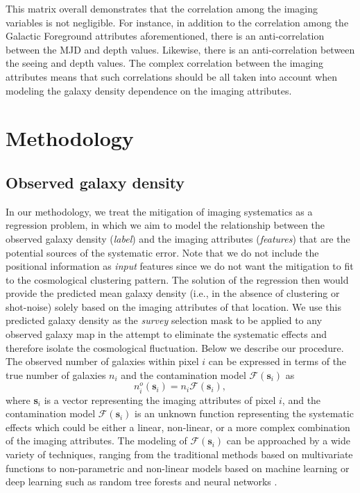 \documentclass[fleqn, usenatbib]{mnras}
\begin{document}
This matrix overall demonstrates that the correlation among the imaging variables is not negligible. For instance, in addition to the correlation among the Galactic Foreground attributes aforementioned, there is an anti-correlation between the MJD and depth values. Likewise, there is an anti-correlation between the seeing and depth values. The complex correlation between the imaging attributes means that such correlations should be all taken into account when modeling the galaxy density dependence on the imaging attributes.

\section{Methodology}\label{sec:method}

\subsection{Observed galaxy density}
In our methodology, we treat the mitigation of imaging systematics as a regression problem, in which we aim to model the relationship between the observed galaxy density (\textit{label}) and the imaging attributes (\textit{features}) that are the potential sources of the systematic error. Note that we do not include the positional information as \textit{input} features since we do not want the mitigation to fit to the cosmological clustering pattern. The solution of the regression then would provide the predicted mean galaxy density (i.e., in the absence of clustering or shot-noise) solely based on the imaging attributes of that location. We use this predicted galaxy density as the \textit{survey} selection mask to be applied to any observed galaxy map in the attempt to eliminate the systematic effects and therefore isolate the cosmological fluctuation. Below we describe our procedure.\\


The observed number of galaxies within pixel $i$ can be expressed in terms of the true number of galaxies $n_{i}$ and the contamination model $\mathcal{F}(\textbf{s}_{i})$ as 
\begin{equation}\label{eq:ngal_fs}
    n_{i}^{o}(\textbf{s}_{i}) = n_{i} \mathcal{F}(\textbf{s}_{i}), 
\end{equation}
where \textbf{s}$_{i}$ is a vector representing the imaging attributes of pixel $i$, and the contamination model $\mathcal{F}(\textbf{s}_i)$ is an unknown function representing the systematic effects which could be either a linear, non-linear, or a more complex combination of the imaging attributes. The modeling of $\mathcal{F}(\textbf{s}_{i})$ can be approached by a wide variety of techniques, ranging from the traditional methods based on multivariate functions to non-parametric and non-linear models based on machine learning or deep learning such as random tree forests and neural networks \citep{breiman2001random, geurts2006extremely}.\\
\end{document}
